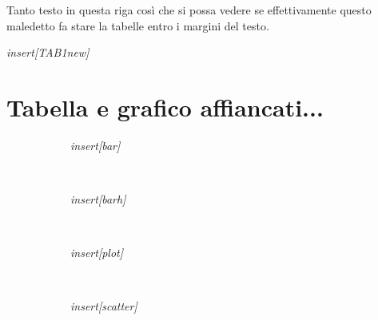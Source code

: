 \documentclass[a4paper, 10pt]{article}
\newcommand{\SRE}[1]{\textit{insert[#1]}}
\begin{document}
Tanto testo in questa riga così che si possa vedere se effettivamente questo maledetto fa stare la tabelle entro i margini del testo.

\tabulinesep=1.5mm



\SRE{TAB1new}

\section*{Tabella e grafico affiancati...}
\begin{figure}[h!]
  \begin{subfigure}[cm]{0.5\linewidth}
    \SRE{bar}
  \end{subfigure}
  ~
  \begin{subfigure}[cm]{0.5\linewidth}    
      \SRE{barh}
  \end{subfigure}
  \\
  \begin{subfigure}[cm]{0.5\linewidth}    
      \SRE{plot}
  \end{subfigure}
  ~ %
  \begin{subfigure}[cm]{0.5\linewidth}    
      \SRE{scatter}
  \end{subfigure}
\end{figure}

\end{document}
